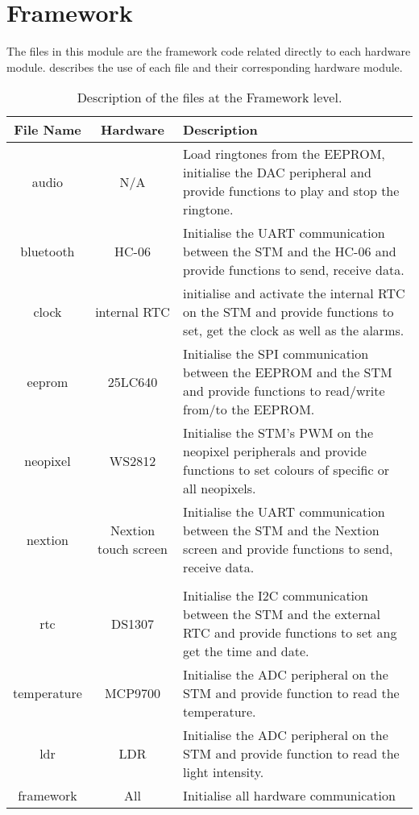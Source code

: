 \section{Framework}
The files in this module are the framework code related directly to each hardware module.  describes the use of each file and their corresponding hardware module.
\begin{table}[h!]
\centering
\begin{tabular}{ccp{20em}}
\hline
\hline
\toprule
\textbf{File Name} & \textbf{Hardware} & \textbf{Description} \\
\bottomrule	
\toprule
audio & N/A & Load ringtones from the EEPROM, initialise the DAC peripheral and provide functions to play and stop the ringtone.  \\
\midrule
bluetooth & HC-06 & Initialise the UART communication between the STM and the HC-06 and provide functions to send, receive data.\\
\midrule
clock & internal RTC & initialise and activate the internal RTC on the STM and provide functions to set, get the clock as well as the alarms.\\
\midrule
eeprom & 25LC640 & Initialise the SPI communication between the EEPROM and the STM and provide functions to read/write from/to the EEPROM.\\
\midrule
neopixel & WS2812 & Initialise the STM's PWM on the neopixel peripherals and provide functions to set colours of specific or all neopixels.\\
\midrule
nextion & Nextion touch screen & Initialise the UART communication between the STM and the Nextion screen and provide functions to send, receive data.\\\\
\midrule
rtc & DS1307 & Initialise the I2C communication between the STM and the external RTC and provide functions to set ang get the time and date.\\
\midrule
temperature & MCP9700 & Initialise the ADC peripheral on the STM and provide function to read the temperature.\\
\midrule
ldr & LDR & Initialise the ADC peripheral on the STM and provide function to read the light intensity.\\
\midrule
framework & All & Initialise all hardware communication\\
\bottomrule
\hline
\end{tabular}
\caption{Description of the files at the Framework level.}
\label{table:framework}
\end{table}

